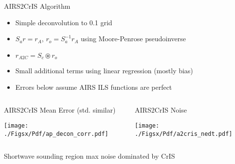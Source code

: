 \documentclass[10pt,t]{beamer}
\begin{document}
\begin{frame}[label={sec:orgefba0a8}]{AIRS2CrIS Algorithm}
\vspace{-0.15in}
\begin{small}
\begin{itemize}
\item Simple deconvolution to 0.1 \wn grid
\item \(S_a r = r_A\), \(r_o = S_a^{-1} r_A\) using Moore-Penrose pseudoinverse
\item \(r_{A2C} = S_c \circledast r_o\)
\item Small additional terms using linear regression (mostly bias)
\item Errors below assume AIRS ILS functions are perfect
\end{itemize}
\end{small}
\vspace{-0.25in}
\begin{columns}
\begin{column}{0.55\columnwidth}
\begin{block}{\footnotesize AIRS2CrIS Mean Error (std. similar)}
\vspace{-0.1in}
\begin{center}
\texttt{[image: ./Figsx/Pdf/ap\_decon\_corr.pdf]}
\end{center}
\end{block}
\end{column}

\begin{column}{0.55\columnwidth}
\begin{block}{\footnotesize AIRS2CrIS Noise}
\vspace{-0.1in}
\begin{center}
\texttt{[image: ./Figsx/Pdf/a2cris\_nedt.pdf]}
\end{center}
\end{block}
\end{column}
\end{columns}

\vspace{-0.1in}
\small Shortwave sounding region max noise dominated by CrIS
\end{frame}
\end{document}
